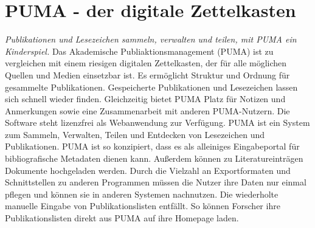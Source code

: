 \chapter{PUMA - der digitale Zettelkasten}
\textit{Publikationen und Lesezeichen sammeln, verwalten und teilen, mit PUMA ein Kinderspiel.}\newline
\newline
Das Akademische Publiaktionsmanagement (PUMA) ist zu vergleichen mit einem riesigen digitalen Zettelkasten, der für alle möglichen Quellen und Medien einsetzbar ist. Es ermöglicht Struktur und Ordnung für gesammelte Publikationen. Gespeicherte Publikationen und Lesezeichen lassen sich schnell wieder finden. Gleichzeitig bietet PUMA Platz für Notizen und Anmerkungen sowie eine Zusammenarbeit mit anderen PUMA-Nutzern. 
Die Software steht lizenzfrei als Webanwendung zur Verfügung.\newline
PUMA ist ein System zum Sammeln, Verwalten, Teilen und Entdecken von Lesezeichen und Publikationen. \newline
\newline 
PUMA ist so konzipiert, dass es als alleiniges Eingabeportal für bibliografische Metadaten dienen kann. Außerdem können zu Literatureinträgen Dokumente hochgeladen werden. \newline
Durch die Vielzahl an Exportformaten und Schnittstellen zu anderen Programmen müssen die Nutzer ihre Daten nur einmal pflegen und können sie in anderen Systemen nachnutzen. Die wiederholte manuelle Eingabe von Publikationslisten entfällt. So können Forscher ihre Publikationslisten direkt aus PUMA auf ihre Homepage laden.  
